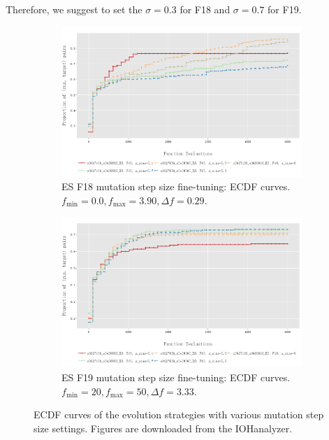 \documentclass{article}
\begin{document}
Therefore, we suggest to set the $\sigma=0.3$ for F18 and $\sigma=0.7$ for F19.



\begin{figure}[!ht]
    \begin{subfigure}[h]{0.95\linewidth}
        \includegraphics[width=\linewidth]{es/f18/ECDF18ss.png}
        \caption{ES F18 mutation step size fine-tuning: ECDF curves. $f_{\min} = 0.0, f_{\max} = 3.90, \Delta f = 0.29$.}
    \end{subfigure}
    \hfill
    \begin{subfigure}[h]{0.95\linewidth}
        \includegraphics[width=\linewidth]{es/f19/ECDF19ss.png}
        \caption{ES F19 mutation step size fine-tuning: ECDF curves. $f_{\min} = 20, f_{\max} = 50, \Delta f = 3.33$.}
    \end{subfigure}
    \caption{ECDF curves of the evolution strategies with various mutation step size settings. Figures are downloaded from the IOHanalyzer.}
    \label{fig:experi-es-ssize-ecdf}
\end{figure}
\end{document}
